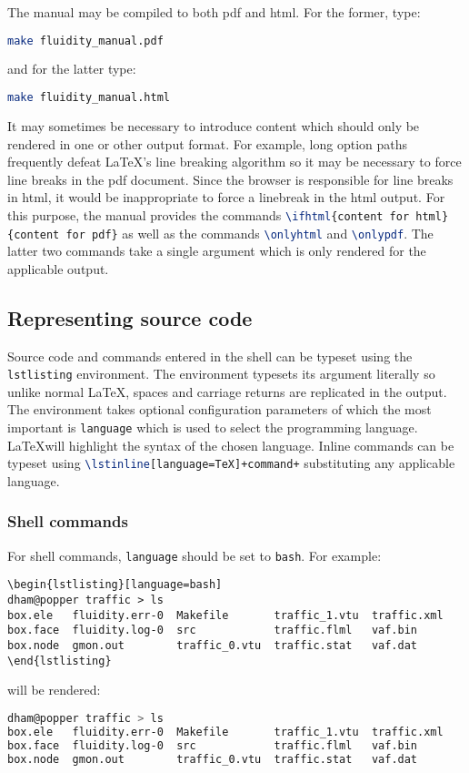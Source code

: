 The manual may be compiled to both pdf and html. For the former, type:
\begin{lstlisting}[language=bash]
  make fluidity_manual.pdf
\end{lstlisting}
and for the latter type:
\begin{lstlisting}[language=bash]
  make fluidity_manual.html
\end{lstlisting}
It may sometimes be necessary to introduce content which should only be
rendered in one or other output format. For example, long option paths
frequently defeat \LaTeX's line breaking algorithm so it may be necessary to
force line breaks in the pdf document. Since the browser is responsible for
line breaks in html, it would be inappropriate to force a linebreak in the
html output. For this purpose, the manual provides the commands
\lstinline[language=TeX]+\ifhtml{content for html}{content for pdf}+ as well
as the commands \lstinline[language=TeX]+\onlyhtml+ and
\lstinline[language=TeX]+\onlypdf+. The latter two commands take a single
argument which is only rendered for the applicable output.

\subsection{Representing source code}

Source code and commands entered in the shell can be typeset using the
\lstinline[language=TeX]+lstlisting+ environment. The environment typesets
its argument literally so unlike normal \LaTeX, spaces and carriage returns
are replicated in the output. The environment takes optional configuration
parameters of which the most important is 
\lstinline[language=TeX]+language+ which is used to select the programming
language. \LaTeX will highlight the syntax of the chosen language. Inline
commands can be typeset using\linebreak
\lstinline[language=TeX]*\lstinline[language=TeX]+command+* substituting any
applicable language. 

\subsubsection{Shell commands}

For shell commands, \lstinline[language=TeX]+language+ should be set to
\lstinline[language=TeX]+bash+. For example:
\begin{verbatim}
\begin{lstlisting}[language=bash]
dham@popper traffic > ls
box.ele   fluidity.err-0  Makefile       traffic_1.vtu  traffic.xml
box.face  fluidity.log-0  src            traffic.flml   vaf.bin
box.node  gmon.out        traffic_0.vtu  traffic.stat   vaf.dat
\end{lstlisting}
\end{verbatim}
will be rendered:
\begin{lstlisting}[language=bash]
dham@popper traffic > ls 
box.ele   fluidity.err-0  Makefile       traffic_1.vtu  traffic.xml
box.face  fluidity.log-0  src            traffic.flml   vaf.bin
box.node  gmon.out        traffic_0.vtu  traffic.stat   vaf.dat
\end{lstlisting}

